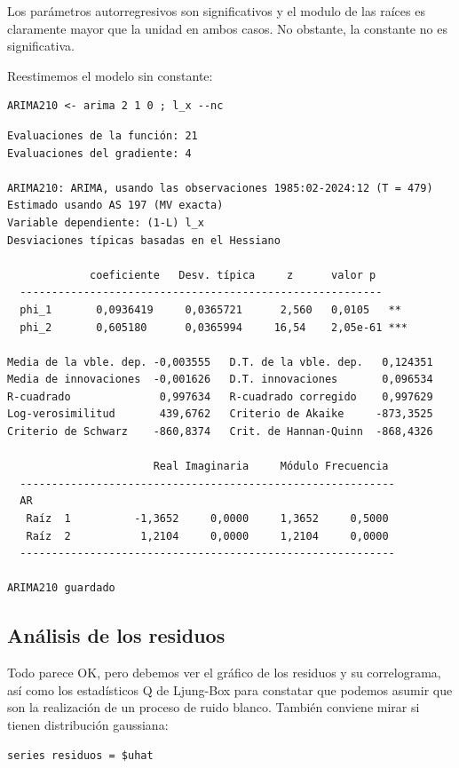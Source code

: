 \documentclass[10pt]{article}
\begin{document}
Los parámetros autorregresivos son significativos y el modulo de las
raíces es claramente mayor que la unidad en ambos casos. No obstante,
la constante no es significativa. 

Reestimemos el modelo sin constante:

\begin{verbatim}
ARIMA210 <- arima 2 1 0 ; l_x --nc
\end{verbatim}

\begin{verbatim}
Evaluaciones de la función: 21
Evaluaciones del gradiente: 4

ARIMA210: ARIMA, usando las observaciones 1985:02-2024:12 (T = 479)
Estimado usando AS 197 (MV exacta)
Variable dependiente: (1-L) l_x
Desviaciones típicas basadas en el Hessiano

             coeficiente   Desv. típica     z      valor p 
  ---------------------------------------------------------
  phi_1       0,0936419     0,0365721      2,560   0,0105   **
  phi_2       0,605180      0,0365994     16,54    2,05e-61 ***

Media de la vble. dep. -0,003555   D.T. de la vble. dep.   0,124351
Media de innovaciones  -0,001626   D.T. innovaciones       0,096534
R-cuadrado              0,997634   R-cuadrado corregido    0,997629
Log-verosimilitud       439,6762   Criterio de Akaike     -873,3525
Criterio de Schwarz    -860,8374   Crit. de Hannan-Quinn  -868,4326

                       Real Imaginaria     Módulo Frecuencia
  -----------------------------------------------------------
  AR
   Raíz  1          -1,3652     0,0000     1,3652     0,5000
   Raíz  2           1,2104     0,0000     1,2104     0,0000
  -----------------------------------------------------------

ARIMA210 guardado
\end{verbatim}
\subsection*{Análisis de los residuos}
\label{sec:orga7a0e70}

Todo parece OK, pero debemos ver el gráfico de los residuos y su
correlograma, así como los estadísticos Q de Ljung-Box para constatar
que podemos asumir que son la realización de un proceso de ruido
blanco. También conviene mirar si tienen distribución gaussiana:


\begin{verbatim}
series residuos = $uhat
\end{verbatim}
\end{document}
